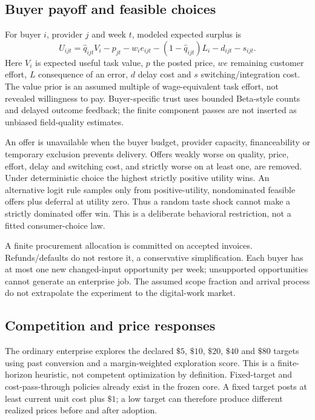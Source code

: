 \documentclass[11pt,a4paper]{article}
\newcommand{\money}[1]{\(\$#1\)}
\begin{document}
\subsection{Buyer payoff and feasible choices}
For buyer \(i\), provider \(j\) and week \(t\), modeled expected surplus is
\begin{equation}
U_{ijt}=\hat q_{ijt}V_i-p_{jt}-w_i e_{ijt}
 -(1-\hat q_{ijt})L_i-d_{ijt}-s_{ijt}.
\label{eq:utility}
\end{equation}
Here \(V_i\) is expected useful task value, \(p\) the posted price, \(w e\) remaining customer effort,
\(L\) consequence of an error, \(d\) delay cost and \(s\) switching/integration cost.
The value prior is an assumed multiple of wage-equivalent task effort, not revealed willingness
to pay. Buyer-specific trust uses bounded Beta-style counts and delayed outcome feedback;
the finite component passes are not inserted as unbiased field-quality estimates.

An offer is unavailable when the buyer budget, provider capacity, financeability or temporary
exclusion prevents delivery. Offers weakly worse on quality, price, effort, delay and switching
cost, and strictly worse on at least one, are removed. Under deterministic choice the highest
strictly positive utility wins. An alternative logit rule samples only from positive-utility,
nondominated feasible offers plus deferral at utility zero. Thus a random taste shock cannot
make a strictly dominated offer win. This is a deliberate behavioral restriction, not a fitted
consumer-choice law.

A finite procurement allocation is committed on accepted invoices. Refunds/defaults do not restore
it, a conservative simplification. Each buyer has at most one new changed-input opportunity per week;
unsupported opportunities cannot generate an enterprise job. The assumed scope fraction and arrival
process do not extrapolate the experiment to the digital-work market.

\subsection{Competition and price responses}
The ordinary enterprise explores the declared \money{5}, \money{10}, \money{20}, \money{40} and
\money{80} targets using past conversion and a margin-weighted exploration score. This is a
finite-horizon heuristic, not competent optimization by definition. Fixed-target and
cost-pass-through policies already exist in the frozen core. A fixed target posts at least current
unit cost plus \money{1}; a low target can therefore produce different realized prices before and
after adoption.
\end{document}
